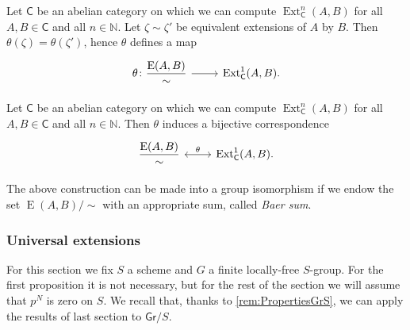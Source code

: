 \begin{lem}
	Let $\mathsf{C}$ be an abelian category on which we
	can compute $\operatorname{Ext}^n_{\mathsf{C}}(A,B)$
	for all $A, B \in \mathsf{C}$ and all $n \in \mathbb{N}$.
	Let $\zeta \sim \zeta'$ be equivalent extensions of
	$A$ by $B$.
	Then $\theta(\zeta) = \theta(\zeta')$, hence $\theta$
	defines a map
	\begin{equation*}
	\begin{tikzcd}[row sep = 0ex
		,/tikz/column 1/.append style={anchor=base east}
		,/tikz/column 2/.append style={anchor=base west}]
		\theta\colon \displaystyle{\frac{\mathrm{E}(A,B)}{\sim}} 
		\arrow[r, "", rightarrow] &
		\operatorname{Ext}^1_{\mathsf{C}}(A,B)
	.\end{tikzcd}
	\end{equation*} 
\end{lem} 


\begin{thm}\label{thm:CorrExt}
	Let $\mathsf{C}$ be an abelian category on which we
	can compute $\operatorname{Ext}^n_{\mathsf{C}}(A,B)$
	for all $A, B \in \mathsf{C}$ and all $n \in \mathbb{N}$.
	Then $\theta$ induces a bijective correspondence
	\begin{equation*}
	\begin{tikzcd}[row sep = 0ex
		,/tikz/column 1/.append style={anchor=base east}
		,/tikz/column 2/.append style={anchor=base west}]
		\displaystyle{\frac{\mathrm{E}(A,B)}{\sim}} 
		\arrow[r, "\theta", leftrightarrow] &
		\operatorname{Ext}^1_{\mathsf{C}}(A,B)
	.\end{tikzcd}
	\end{equation*} 
\end{thm} 


\begin{rem}
	The above construction can be made into a group
	isomorphism if we endow the set \(\operatorname{E}(A,B) / \sim\)
	with an appropriate sum, called \emph{Baer sum}.
\end{rem}



\subsubsection{Universal extensions}
For this section we fix $S$ a scheme and $G$ a finite locally-free $S$-group.
For the first proposition it is not necessary, but for the rest of the section we will
assume that $p^N$ is zero on $S$.
We recall that, thanks to \cref{rem:PropertiesGrS},
we can apply the results of last section to $\mathsf{Gr}/S$.


